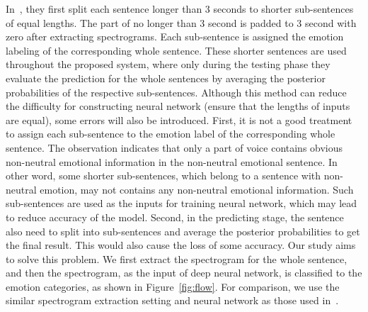 \documentclass[a4paper]{article}
\begin{document}
In~\cite{satt2017}, they first split each sentence longer than 3 seconds to shorter sub-sentences of equal lengths. The part of no longer than 3 second is padded to 3 second with zero after extracting spectrograms. Each sub-sentence is assigned the emotion labeling of the corresponding whole sentence. These shorter sentences are used throughout the proposed system, where only during the testing phase they evaluate the prediction for the whole sentences by averaging the posterior probabilities of the respective sub-sentences. Although this method can reduce the difficulty for constructing neural network (ensure that the lengths of inputs are equal), some errors will also be introduced. First, it is not a good treatment to assign each sub-sentence to the emotion label of the corresponding whole sentence. The observation indicates that only a part of voice contains obvious non-neutral emotional information in the non-neutral emotional sentence. In other word, some shorter sub-sentences, which belong to a sentence with non-neutral emotion, may not contains any non-neutral emotional information. Such sub-sentences are used as the inputs for training neural network, which may lead to reduce accuracy of the model. Second, in the predicting stage, the sentence also need to split into sub-sentences and average the posterior probabilities to get the final result. This would also cause the loss of some accuracy. Our study aims to solve this problem. We first extract the spectrogram for the whole sentence, and then the spectrogram, as the input of deep neural network, is classified to the emotion categories, as shown in Figure~\ref{fig:flow}. For comparison, we use the similar spectrogram extraction setting and neural network as those used in~\cite{satt2017}.
\end{document}
